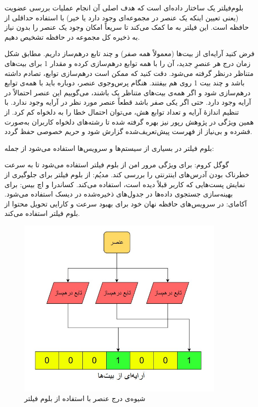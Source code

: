 
بلوم‌فیلتر یک ساختار داده‌ای است که هدف اصلی آن انجام عملیات بررسی عضویت (یعنی تعیین اینکه یک عنصر در مجموعه‌ای وجود دارد یا خیر) با استفاده حداقلی از حافظه است. این فیلتر به ما کمک می‌کند تا سریعاً امکان وجود یک عنصر را بدون نیاز به ذخیره کل مجموعه در حافظه تشخیص دهیم.

فرض کنید آرایه‌ای از بیت‌ها (معمولاً همه صفر) و چند تابع درهم‌ساز داریم. مطابق شکل  زمان درج هر عنصرِ جدید، آن را با همه توابع درهم‌سازی کرده و مقدار 1 برای بیت‌های متناظر درنظر گرفته می‌شود. دقت کنید که ممکن است درهم‌سازی توابع، تصادم داشته باشد و چند بیت 1 روی هم بیفتند. هنگام پرس‌وجوی عنصر،  دوباره باید با همه‌ی توابع درهم‌سازی شود و اگر همه‌ی بیت‌های متناظر یک باشند، می‌گوییم این عنصر احتمالاً در آرایه وجود دارد. حتی اگر یکی صفر باشد قطعاً عنصر مورد نظر در آرایه وجود ندارد. با تنظیم اندازهٔ آرایه و تعداد توابع هش، می‌توان احتمال خطا را به دلخواه کم کرد. از همین ویژگی در پژوهش رپور نیز بهره گرفته شده تا رشته‌های دلخواه کاربران به‌صورت فشرده و بی‌نیاز از فهرست پیش‌تعریف‌شده گزارش شود و حریم خصوصی حفظ گردد.

بلوم فیلتر در بسیاری از سیستم‌ها و سرویس‌ها استفاده می‌شود از جمله:

 گوگل کروم: برای ویژگی مرور امن از بلوم فیلتر استفاده می‌شود تا به سرعت خطرناک بودن آدرس‌های اینترنتی را بررسی کند.
 مدیُم: از بلوم فیلتر برای جلوگیری از نمایش پست‌هایی که کاربر قبلاً دیده است، استفاده می‌کند.
 کساندرا و اچ بیس: برای بهینه‌سازی جستجوی داده‌ها در جدول‌های ذخیره‌شده در دیسک استفاده می‌شود.
 آکامای: در سرویس‌های حافظه نهان خود برای بهبود سرعت و کارایی تحویل محتوا از بلوم فیلتر استفاده می‌کند.

\begin{figure}[h]
  \centering
  \includegraphics[width=0.9\textwidth]{figs/BloomFilter.jpg}
  \caption{شیوه‌ی درج عنصر با استفاده از بلوم فیلتر}
  \label{fig:BloomFilter}
\end{figure}



